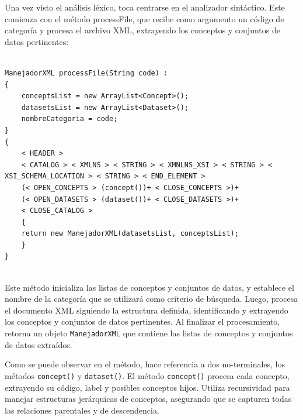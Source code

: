 Una vez visto el análisis léxico, toca centrarse en el analizador sintáctico. Este comienza con el método processFile, que recibe como argumento un código de categoría y procesa el archivo XML, extrayendo los conceptos y conjuntos de datos pertinentes:

\lstset{inputencoding=utf8/latin1}
\begin{lstlisting}

ManejadorXML processFile(String code) :
{
    conceptsList = new ArrayList<Concept>();
    datasetsList = new ArrayList<Dataset>();
    nombreCategoria = code;
}
{
    < HEADER > 
    < CATALOG > < XMLNS > < STRING > < XMNLNS_XSI > < STRING > < XSI_SCHEMA_LOCATION > < STRING > < END_ELEMENT >
    (< OPEN_CONCEPTS > (concept())+ < CLOSE_CONCEPTS >)+
    (< OPEN_DATASETS > (dataset())+ < CLOSE_DATASETS >)+
    < CLOSE_CATALOG >
    {
    return new ManejadorXML(datasetsList, conceptsList);
    }
}
    
\end{lstlisting}

Este método inicializa las listas de conceptos y conjuntos de datos, y establece el nombre de la categoría que se utilizará como criterio de búsqueda. Luego, procesa el documento XML siguiendo la estructura definida, identificando y extrayendo los conceptos y conjuntos de datos pertinentes. Al finalizar el procesamiento, retorna un objeto \lstinline|ManejadorXML| que contiene las listas de conceptos y conjuntos de datos extraídos.

Como se puede observar en el método, hace referencia a dos no-terminales, los métodos \lstinline|concept()| y \lstinline|dataset()|.
El método \lstinline|concept()| procesa cada concepto, extrayendo su código, label y posibles conceptos hijos. Utiliza recursividad para manejar estructuras jerárquicas de conceptos, asegurando que se capturen todas las relaciones parentales y de descendencia.

